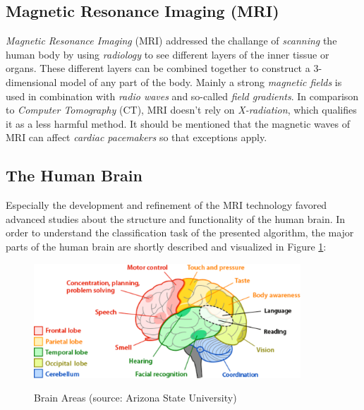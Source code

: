 \documentclass[twoside,11pt]{article}
\begin{document}
\subsection{Magnetic Resonance Imaging (MRI)}
\textit{Magnetic Resonance Imaging} (MRI) addressed the challange of 
\textit{scanning} the human body by using \textit{radiology}  to see different layers of the inner tissue or organs. These different layers can be combined together to construct a 3-dimensional model of any part of the body. Mainly a strong  \textit{magnetic fields} is used in combination with \textit{radio waves}  and so-called \textit{field gradients}.
In comparison to \textit{Computer Tomography} (CT), MRI doesn't rely on \textit{X-radiation}, which qualifies it as a less harmful method. It should be mentioned that the magnetic waves of MRI can affect \textit{cardiac pacemakers} so that exceptions apply. \citep{edelman1993magnetic}

\subsection{The Human Brain}
Especially the development and refinement of the MRI technology favored advanced studies about the structure and functionality of the human brain. In order to understand the classification task of the presented algorithm, the major parts of the human brain are shortly described and visualized in Figure \ref{fig:brain}:
\begin{figure}
	\centering
	\includegraphics[width=10cm]{brain-areas}
	\label{fig:brain}
	\caption{Brain Areas (source: Arizona State University)}
\end{figure}%
\end{document}
